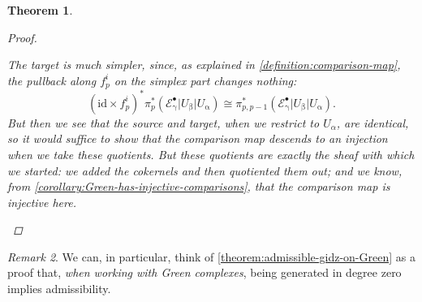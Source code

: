 \documentclass[11pt,fleqn]{article}
\theoremstyle{plain}
\newtheorem{theorem}{Theorem}[subsection]
\theoremstyle{definition}
\theoremstyle{remark}
\newtheorem{remark}[theorem]{Remark}
\numberwithin{equation}{theorem}
\newcommand{\restricted}{\mathbin{\big\vert}}
\newcommand{\id}{\mathrm{id}}
\begin{document}
\begin{theorem}
\begin{proof}
\begin{enumerate}
\begin{enumerate}[(i)]
                                The target is much simpler, since, as explained in \cref{definition:comparison-map}, the pullback along $f_p^i$ on the simplex part changes nothing:
                                \begin{equation*}
                                    \left(\id\times f_p^i\right)^* \pi_p^* \left(\mathcal{E}_\upgamma^\bullet \restricted U_\upbeta \restricted U_\upalpha\right)
                                    \cong
                                    \pi_{p,p-1}^* \left(\mathcal{E}_\upgamma^\bullet \restricted U_\upbeta \restricted U_\upalpha\right).
                                \end{equation*}
                                But then we see that the source and target, \emph{when we restrict to $U_\alpha$}, are identical, so it would suffice to show that the comparison map descends to an injection when we take these quotients.
                                But these quotients are exactly the sheaf with which we started: we added the cokernels and then quotiented them out; and we know, from \cref{corollary:Green-has-injective-comparisons}, that the comparison map is injective here.
                        \end{enumerate}
                \end{enumerate}
            \end{proof}
        \end{theorem}

        \begin{remark}
            We can, in particular, think of \cref{theorem:admissible-gidz-on-Green} as a proof that, \emph{when working with Gre{}en complexes}, being generated in degree zero implies admissibility.
        \end{remark}
\end{document}
